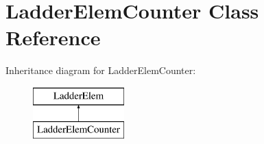 \hypertarget{class_ladder_elem_counter}{\section{Ladder\-Elem\-Counter Class Reference}
\label{class_ladder_elem_counter}
}
Inheritance diagram for Ladder\-Elem\-Counter\-:\begin{figure}[H]
\begin{center}
\leavevmode
\includegraphics[height=2.000000cm]{class_ladder_elem_counter}
\end{center}
\end{figure}

